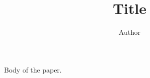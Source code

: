 \documentclass[a4paper, 10pt]{amsart}
\title[]{Title}
\author[]{\textrm{Author}}
\theoremstyle{definition}
\theoremstyle{definition}
\begin{document}
\maketitle

Body of the paper.
\end{document}
